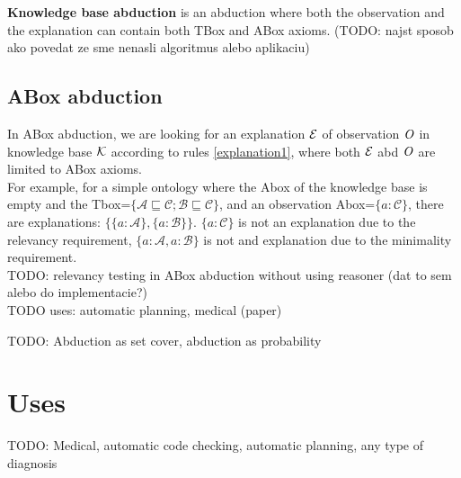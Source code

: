 \textbf{Knowledge base abduction} is an abduction where both the observation and the explanation can contain both TBox and ABox axioms.  (TODO: najst sposob ako povedat ze sme nenasli algoritmus alebo aplikaciu)



\subsection{ABox abduction}
In ABox abduction, we are looking for an explanation $\mathcal{E}$ of observation $\mathit{O}$ in knowledge base $\mathcal{K}$ according to rules \ref{explanation1}, where both $\mathcal{E}$ abd $\mathit{O}$ are limited to ABox axioms. \\ 



For example, for a simple ontology where the Abox of the knowledge base is empty and the Tbox=$\{ \mathcal{A} \sqsubseteq \mathcal{C} ; \mathcal{B} \sqsubseteq \mathcal{C} \} $, and an observation Abox=$\{a:\mathcal{C}\}$, there are  explanations: $\{ \{a:\mathcal{A}\},\{ a: \mathcal{B}\}\}$.   $\{a:\mathcal{C}\}$ is not an explanation due to the relevancy requirement, $\{ a:\mathcal{A}, a:\mathcal{B} \}$ is not and explanation due to the minimality requirement. \\

TODO: relevancy testing in ABox abduction without using reasoner (dat to sem alebo do implementacie?)\\

TODO uses: automatic planning, medical (paper)



TODO: Abduction as set cover, abduction as probability
\section{Uses}
TODO: Medical, automatic code checking, automatic planning, any type of diagnosis